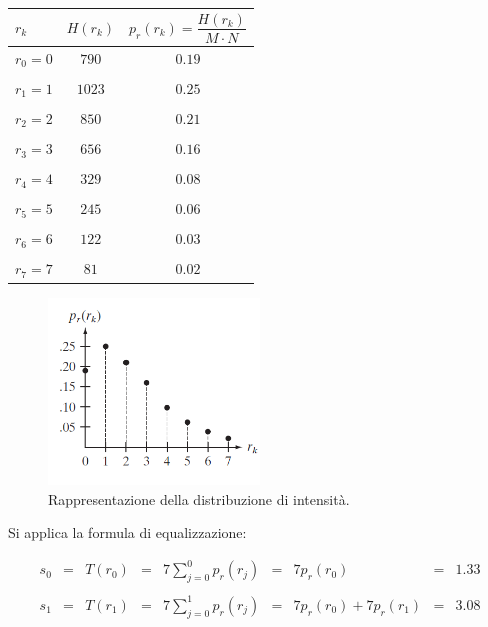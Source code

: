 \documentclass[a4paper]{article}
\begin{document}
	\begin{table}[!htbp]
		\centering
		\begin{tabular}{@{} l c c @{}}
			\toprule
			$r_{k}$ & $H\left(r_{k}\right)$ & $p_{r}\left(r_{k}\right) = \dfrac{H\left(r_{k}\right)}{M \cdot N}$ \\
			\midrule
			$r_{0} = 0$	& $790$	& $0.19$ \\
			&& \\
			$r_{1} = 1$	& $1023$& $0.25$ \\
			&& \\
			$r_{2} = 2$	& $850$	& $0.21$ \\
			&& \\
			$r_{3} = 3$	& $656$	& $0.16$ \\
			&& \\
			$r_{4} = 4$	& $329$	& $0.08$ \\
			&& \\
			$r_{5} = 5$	& $245$	& $0.06$ \\
			&& \\
			$r_{6} = 6$	& $122$	& $0.03$ \\
			&& \\
			$r_{7} = 7$	& $81$	& $0.02$ \\
			\bottomrule
		\end{tabular}
	\end{table}

	\begin{figure}[!htp]
		\centering
		\includegraphics[width=0.5\textwidth]{img/eg_equalizzazione.png}
		\caption{Rappresentazione della distribuzione di intensità.}
	\end{figure}
	
	\noindent
	Si applica la formula di equalizzazione:
	
	\begin{equation*}
		\begin{array}{lllllllll}
			s_{0} & = & T\left(r_{0}\right) & = & 7\displaystyle\sum_{j=0}^{0} p_{r}\left(r_{j}\right) & = & 7p_{r}\left(r_{0}\right) & = & 1.33 \\
			&&&&&&&&\\
			s_{1} & = & T\left(r_{1}\right) & = & 7\displaystyle\sum_{j=0}^{1} p_{r}\left(r_{j}\right) & = & 7p_{r}\left(r_{0}\right) + 7p_{r}\left(r_{1}\right) & = & 3.08
		\end{array}
	\end{equation*}
	
\end{document}
